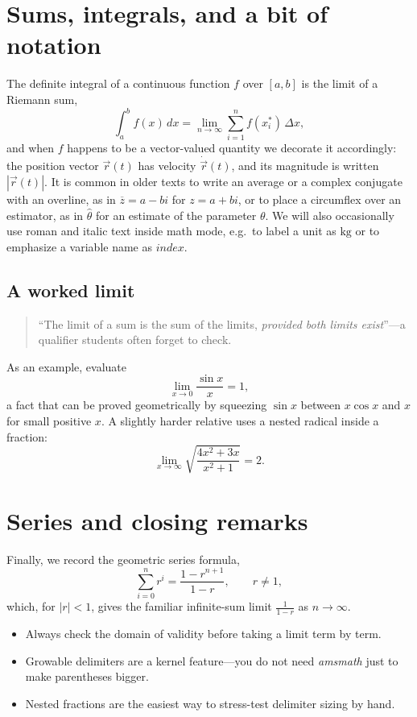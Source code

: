 \documentclass[12pt]{article}
\begin{document}
\section{Sums, integrals, and a bit of notation}

The definite integral of a continuous function $f$ over $[a,b]$ is the limit of a Riemann
sum,
\[
  \int_a^b f(x)\, dx = \lim_{n \to \infty} \sum_{i=1}^{n} f(x_i^*) \, \Delta x,
\]
and when $f$ happens to be a vector-valued quantity we decorate it accordingly: the
position vector $\vec{r}(t)$ has velocity $\dot{\vec{r}}(t)$, and its magnitude is written
$\left| \vec{r}(t) \right|$. It is common in older texts to write an average or a complex
conjugate with an overline, as in $\overline{z} = a - bi$ for $z = a + bi$, or to place a
circumflex over an estimator, as in $\hat{\theta}$ for an estimate of the parameter
$\theta$. We will also occasionally use roman and italic text inside math mode, e.g.\ to
label a unit as $\mathrm{kg}$ or to emphasize a variable name as $\mathit{index}$.

\subsection{A worked limit}

\begin{quote}
``The limit of a sum is the sum of the limits, \emph{provided both limits exist}''---a
qualifier students often forget to check.
\end{quote}

As an example, evaluate
\[
  \lim_{x \to 0} \frac{\sin x}{x} = 1,
\]
a fact that can be proved geometrically by squeezing $\sin x$ between $x\cos x$ and $x$ for
small positive $x$. A slightly harder relative uses a nested radical inside a fraction:
\[
  \lim_{x \to \infty} \sqrt{\frac{4x^2 + 3x}{x^2 + 1}} = 2.
\]

\section{Series and closing remarks}

Finally, we record the geometric series formula,
\[
  \sum_{i=0}^{n} r^i = \frac{1 - r^{n+1}}{1 - r}, \qquad r \neq 1,
\]
which, for $|r| < 1$, gives the familiar infinite-sum limit $\frac{1}{1-r}$ as
$n \to \infty$.

\begin{itemize}
  \item Always check the domain of validity before taking a limit term by term.
  \item Growable delimiters are a kernel feature---you do not need \emph{amsmath} just to
    make parentheses bigger.
  \item Nested fractions are the easiest way to stress-test delimiter sizing by hand.
\end{itemize}
\end{document}

